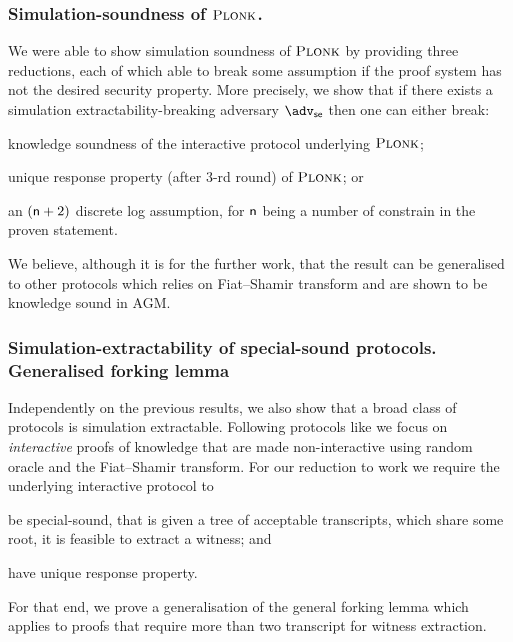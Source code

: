 \documentclass[runningheads,11pt]{llncs}
\begin{document}
	\subsubsection*{Simulation-soundness of $\textsc{Plonk}$.}
	We were able to show simulation soundness of $\textsc{Plonk}$ by providing three reductions, each of which able to break some assumption if the proof system has not the desired security property. 
	More precisely, we show that if there exists a simulation extractability-breaking adversary $\advse$ then one can either break: 
	\begin{compactenum}
		\item \label{it:ks} knowledge soundness of the interactive protocol underlying $\textsc{Plonk}$; 
		\item \label{it:dlog} unique response property (after $3$-rd round) of $\textsc{Plonk}$; or 
		\item \label{it:ur} an $(\mathsf{n} + 2)$ discrete log assumption, for $\mathsf{n}$ being a number of constrain in the proven statement.
	\end{compactenum}
	
	We believe, although it is for the further work, that the result can be generalised to other protocols which relies on Fiat--Shamir transform and are shown to be knowledge sound in AGM.
	
	\subsubsection*{Simulation-extractability of special-sound protocols. Generalised forking lemma}
	Independently on the previous results, we also show that a broad class of protocols is simulation extractable. 
	Following protocols like \cite{EPRINT:GabWilCio19,CCS:MBKM19,EC:CHMMVW20} we focus on \emph{interactive} proofs of knowledge that are made non-interactive using random oracle and the Fiat--Shamir transform. For our reduction to work we require the underlying interactive protocol to 
	\begin{compactenum}
		\item be special-sound, that is given a tree of acceptable transcripts, which share some root, it is feasible to extract a witness; and
		\item have unique response property.
	\end{compactenum}
	For that end, we prove a generalisation of the general forking lemma which applies to proofs that require more than two transcript for witness extraction.
	
	
	
\end{document}
